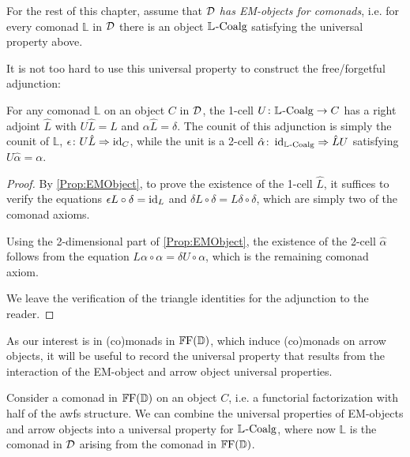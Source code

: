 For the rest of this chapter, assume that $\mathcal{D}$ \emph{has EM-objects for comonads}, i.e. for every comonad $\mathbb{L}$ in $\mathcal{D}$ there is an object $\mathbb{L}_{}\text{-}\mathrm{Coalg}$ satisfying the universal property above.

It is not too hard to use this universal property to construct the free/forgetful adjunction:

\begin{proposition}
	For any comonad $\mathbb{L}$ on an object $C$ in $\mathcal{D}$, the 1-cell $U\colon\mathbb{L}_{}\text{-}\mathrm{Coalg}\to C$ has a right adjoint $\hat{L}$ with $U\hat{L}=L$ and $\alpha\hat{L}=\delta$. The counit of this adjunction is simply the counit of $\mathbb{L}$, $\epsilon\colon U\hat{L}\Rightarrow\operatorname{id}_C$, while the unit is a 2-cell $\hat{\alpha}\colon\operatorname{id}_{\mathbb{L}_{}\text{-}\mathrm{Coalg}}\Rightarrow\hat{L}U$ satisfying $U\hat{\alpha}=\alpha$.
\end{proposition}
\begin{proof}
	By \cref{Prop:EMObject}, to prove the existence of the 1-cell $\hat{L}$, it suffices to verify the equations $\epsilon L\circ\delta=\operatorname{id}_L$ and $\delta L\circ\delta=L\delta\circ\delta$, which are simply two of the comonad axioms.

	Using the 2-dimensional part of \cref{Prop:EMObject}, the existence of the 2-cell $\hat{\alpha}$ follows from the equation $L\alpha\circ\alpha=\delta U\circ\alpha$, which is the remaining comonad axiom.

	We leave the verification of the triangle identities for the adjunction to the reader.
\end{proof}

As our interest is in (co)monads in $\mathbb{F}\mathrm{F}(\mathbb{D})$, which induce (co)monads on arrow objects, it will be useful to record the universal property that results from the interaction of the EM-object and arrow object universal properties.

Consider a comonad in $\mathbb{F}\mathrm{F}(\mathbb{D})$ on an object $C$, i.e. a functorial factorization with half of the awfs structure. We can combine the universal properties of EM-objects and arrow objects into a universal property for $\mathbb{L}_{}\text{-}\mathrm{Coalg}$, where now $\mathbb{L}$ is the comonad in $\mathcal{D}$ arising from the comonad in $\mathbb{F}\mathrm{F}(\mathbb{D})$.

